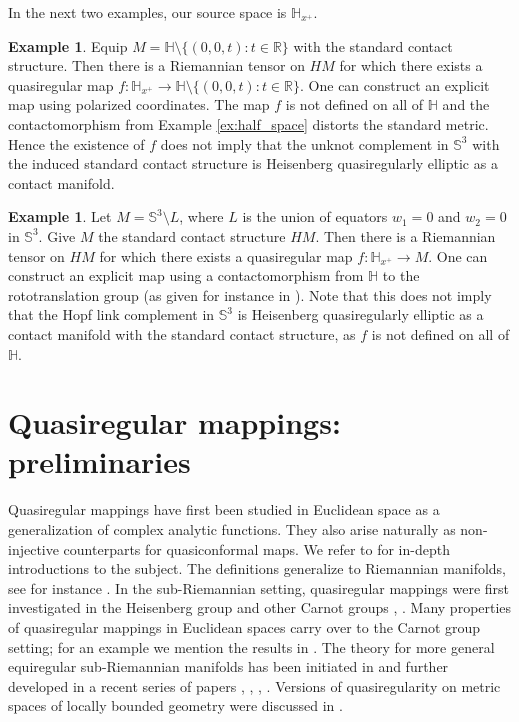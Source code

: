 \documentclass[10pt,letterpaper]{amsart}
\theoremstyle{definition}
\newtheorem{example}[thm]{Example}
\numberwithin{thm}{subsection}
\numberwithin{equation}{section}
\begin{document}
In the next two examples, our source space is ${\mathbb H}_{x^+}$.

\begin{example}
Equip $M={\mathbb H}\setminus \{(0,0,t){:} t\in {\mathbb R}\}$ with the standard contact structure. Then there is a Riemannian tensor on $HM$
for which there exists a quasiregular map $f:{\mathbb H}_{x^+}\rightarrow {\mathbb H}\setminus \{(0,0,t){:} t\in {\mathbb R}\}$. One
can construct an explicit map using polarized coordinates. The map $f$ is not defined on all of ${\mathbb H}$ and the contactomorphism from Example \ref{ex:half_space} distorts the standard metric.
Hence the existence of $f$ does not imply
that the unknot complement in ${\mathbb S}^3$ with the induced standard
contact structure is Heisenberg quasiregularly elliptic as a contact manifold.
\end{example}

\begin{example}
Let $M={\mathbb S}^3\setminus L$, where $L$ is the union of equators
$w_1=0$ and $w_2=0$ in ${\mathbb S}^3$. Give $M$ the standard contact
structure $HM$. Then there is a Riemannian tensor on $HM$ for which there exists a quasiregular map $f:{\mathbb H}_{x^+}\rightarrow M$. One can construct an explicit map using a contactomorphism from ${\mathbb H}$ to the rototranslation group
(as given for instance in \cite{FKD}). Note that this does not
imply that the Hopf link complement in ${\mathbb S}^3$ is Heisenberg
quasiregularly elliptic as a contact manifold with the standard
contact structure, as $f$ is not defined on all of ${\mathbb H}$.
\end{example}

\section{Quasiregular mappings: preliminaries}\label{s:prelim}

Quasiregular mappings have first been studied in Euclidean space
as a generalization of complex analytic functions. They also arise
naturally as non-injective counterparts for quasiconformal maps.
We refer to \cite{MR994644,MR1238941} for in-depth introductions
to the subject. The definitions generalize to Riemannian
manifolds, see for instance \cite{MR2492501}. In the
sub-Riemannian setting, quasiregular mappings were first
investigated in the Heisenberg group and other Carnot groups
\cite{MR1630785}, \cite{Da}. Many properties of quasiregular
mappings in Euclidean spaces carry over to the Carnot group
setting; for an example we mention the results in
\cite{MR2252688}. The theory for more general equiregular
sub-Riemannian manifolds has been initiated in \cite{FLP} and
further developed in a recent series of papers \cite{GNW},
\cite{GL},  \cite{GW}, \cite{MR3456891}. Versions of
quasiregularity on metric spaces of locally bounded geometry were
discussed in \cite{MR2275345}.
\end{document}
